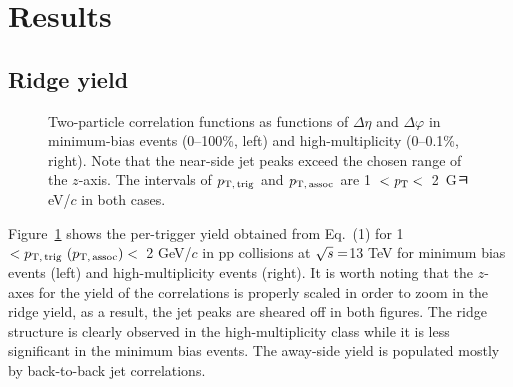 
\section {Results}
\label{sec:results}

\subsection{Ridge yield}
\label{sec:resultunbiased}
\begin{figure}[b!]
	\centering
	\caption{ Two-particle correlation functions as functions of $\Delta\eta$ and $\Delta\varphi$ in minimum-bias events (0--100\%, left) and high-multiplicity (0--0.1\%, right). Note that the near-side jet peaks exceed the chosen range of the $z$-axis. The intervals of $p_\mathrm{T,\,trig}$ and $p_\mathrm{T,\,assoc}$ are 1~$<\it{p}_{\rm{T}}<$~2~GㅋeV/$c$ in both cases.}
	\label{fig:PlotCorrMBHMT}
\end{figure}

Figure~\ref{fig:PlotCorrMBHMT} shows the per-trigger yield obtained from Eq.~(1) for 1~$<p_\mathrm{T,\,trig}~\mathrm (p_\mathrm{T,\,assoc})<$~2 GeV/$c$ in pp collisions at $\sqrt{\it{s}} = $\unit{13} {\rm{}TeV} for minimum bias events (left) and high-multiplicity events (right). It is worth noting that the $z$-axes for the yield of the correlations is properly scaled in order to zoom in the ridge yield, as a result, the jet peaks are sheared off in both figures. The ridge structure is clearly observed in the high-multiplicity class while it is less significant in the minimum bias events. The away-side yield is populated mostly by back-to-back jet correlations.

